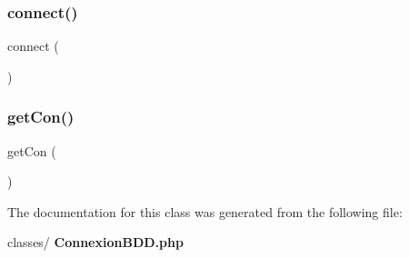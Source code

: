 \subsubsection{connect()}
{\footnotesize\ttfamily connect (\begin{DoxyParamCaption}{ }\end{DoxyParamCaption})}

\mbox{\label{class_connexion_b_d_d_a69d47b951343847eb872495590d43109}} 
\subsubsection{get\+Con()}
{\footnotesize\ttfamily get\+Con (\begin{DoxyParamCaption}{ }\end{DoxyParamCaption})}



The documentation for this class was generated from the following file\+:\begin{DoxyCompactItemize}
\item 
classes/\textbf{ Connexion\+B\+D\+D.\+php}\end{DoxyCompactItemize}
